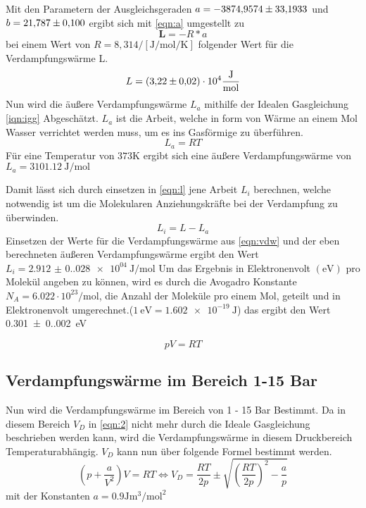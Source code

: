 Mit den Parametern der Ausgleichsgeraden $a = \num{-3874.9574 +- 33.1933}
$ und $b = \num{21.787 +- 0.10}$ ergibt sich mit \autoref{eqn:a}
umgestellt zu
\begin{equation}
  \symbf{L} = -R * a
\end{equation}
bei einem Wert von $R =  8,314/[\unit{\joule\per\mol\per\kelvin}] $ 
folgender Wert für die Verdampfungswärme L.
\begin{equation*}
  \label{eqn:vdw}
  L = \num{3.22 +- 0.02 e4} \unit{\joule\per\mol}
\end{equation*}
Nun wird die äußere Verdampfungswärme $L_a$ mithilfe der Idealen 
Gasgleichung \autoref{iqn:igg} Abgeschätzt. $L_a$ ist die Arbeit, welche 
in form von Wärme an einem Mol Wasser verrichtet werden muss, um es
ins Gasförmige zu überführen. 
\begin{equation}
  L_a = RT
\end{equation}
Für eine Temperatur von $373 \unit{\kelvin}$ ergibt sich eine äußere 
Verdampfungswärme von $ L_a = \qty{3101.12}{\joule\per\mol}$

Damit lässt sich durch einsetzen in \autoref{eqn:l} jene Arbeit $L_i$
berechnen, welche notwendig ist um die Molekularen Anziehungskräfte 
bei der Verdampfung zu überwinden.
\begin{equation}
  \label{eqn:l}
  L_i = L - L_a
\end{equation}
Einsetzen der Werte für die Verdampfungswärme aus \autoref{eqn:vdw} und der 
eben berechneten äußeren Verdampfungswärme ergibt den Wert $L_i = \qty{2.912(0.028)e04}{\joule\per\mol}$
Um das Ergebnis in Elektronenvolt $(\unit{\eV})$ pro Molekül angeben zu können, wird es durch die 
Avogadro Konstante $N_A = 6.022 \cdot 10^23 \unit{\per\mol}$,
die Anzahl der Moleküle pro einem Mol, geteilt und in Elektronenvolt 
umgerechnet.($\qty{1}{\eV} = \qty{1.602e-19}{\joule}$)
das ergibt den Wert \qty{0.301(0.002)}{\eV}

\begin{equation}
  \label{qun:igg}
  pV = RT
\end{equation}

\subsection{Verdampfungswärme im Bereich 1-15 Bar}

Nun wird die Verdampfungswärme im Bereich von 1 - 15 Bar Bestimmt. 
Da in diesem Bereich $V_D$ in \autoref{eqn:2} nicht mehr durch die Ideale 
Gasgleichung beschrieben werden kann, wird die Verdampfungswärme in diesem 
Druckbereich Temperaturabhängig. $V_D$ kann nun über folgende Formel bestimmt 
werden.
\begin{equation}
  \left(p + \frac{a}{V^2}\right)V = RT \Leftrightarrow V_D = \frac{RT}{2p} \pm \sqrt{\left(\frac{RT}{2p}\right)^2-\frac{a}{p}}
\end{equation}
mit der Konstanten $a = 0.9 \unit{\joule\cubic\meter\per\square\mole}$

